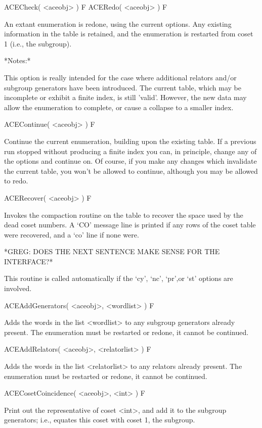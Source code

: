 \>ACECheck( <aceobj> ) F
\>ACERedo( <aceobj> ) F

An extant  enumeration is redone,  using the current  options.  Any
existing information in the table  is retained, and the enumeration is
restarted from coset 1 (i.e., the subgroup).

*Notes:*

This option is really intended  for the case where additional relators
and/or subgroup  generators have been introduced.   The current table,
which may be  incomplete or exhibit a finite  index, is still 'valid'.
However, the new data may  allow the enumeration to complete, or cause
a collapse to a smaller index.

\>ACEContinue( <aceobj> ) F

Continue the  current enumeration,  building upon the  existing table.
If a previous run stopped without producing a finite index you can, in
principle, change any  of the options and continue  on.  Of course,
if you make any changes  which invalidate the current table, you won't
be allowed to continue, although you may be allowed to redo.


\>ACERecover( <aceobj> ) F

Invokes the compaction routine on the table to recover the space  used
by the dead coset numbers. A `CO' message line is printed if any  rows
of the coset table were recovered, and a `co' line if none were.

*GREG: DOES THE NEXT SENTENCE MAKE SENSE FOR THE INTERFACE?*

This routine is  called automatically if the `cy',  `nc', `pr',or `st'
options are involved.


\>ACEAddGenerators( <aceobj>, <wordlist> ) F

Adds the words in the list <wordlist> to any subgroup generators already
present.
The enumeration must be restarted or redone, it cannot be continued.

\>ACEAddRelators( <aceobj>, <relatorlist> ) F

Adds the words in the list <relatorlist> to any relators already present.
The enumeration must be restarted or redone, it cannot be continued.

\>ACECosetCoincidence( <aceobj>, <int> ) F

Print out the representative of coset <int>, and add it to the
subgroup generators; i.e., equates this coset with coset 1, the
subgroup.

\enditems


